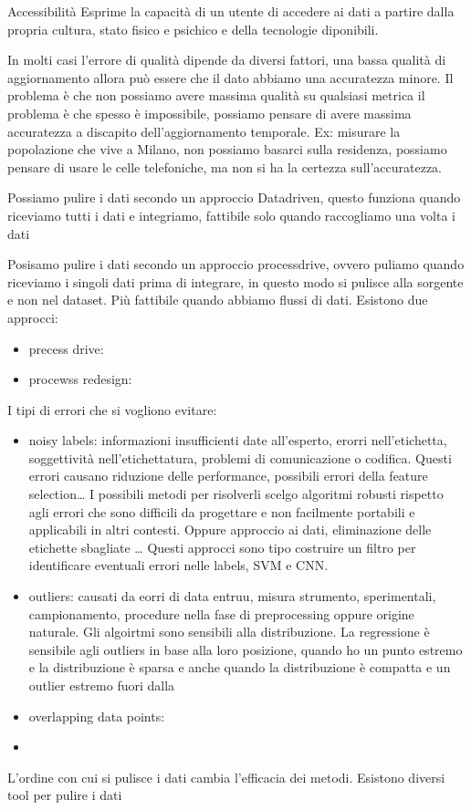 Accessibilità
Esprime la capacità di un utente di accedere ai dati a partire dalla propria cultura, stato 
fisico e psichico e della tecnologie diponibili.

In molti casi l'errore di qualità dipende da diversi fattori, una bassa qualità di 
aggiornamento allora può essere che il dato abbiamo una accuratezza minore. Il problema 
è che non possiamo avere massima qualità su qualsiasi metrica il problema è che 
spesso è impossibile, possiamo pensare di avere massima accuratezza a discapito 
dell'aggiornamento temporale. Ex: misurare la popolazione che vive a Milano, non 
possiamo basarci sulla residenza, possiamo pensare di usare le celle telefoniche, ma
non si ha la certezza sull'accuratezza.
 
Possiamo pulire i dati secondo un approccio Datadriven, questo funziona quando 
riceviamo tutti i dati e integriamo, fattibile solo quando raccogliamo una volta i dati

Posisamo pulire i dati secondo un approccio processdrive, ovvero puliamo quando 
riceviamo i singoli dati prima di integrare, in questo modo si pulisce alla sorgente 
e non nel dataset. Più fattibile quando abbiamo flussi di dati.
Esistono due approcci:
\begin{itemize}
      \item precess drive: 
      \item procewss redesign:
\end{itemize}

I tipi di errori che si vogliono evitare:
\begin{itemize}
      \item noisy labels: informazioni insufficienti date all'esperto, erorri 
      nell'etichetta, soggettività nell'etichettatura, problemi di comunicazione o codifica.
      Questi errori causano riduzione delle performance, possibili errori della 
      feature selection\dots
      I possibili metodi per risolverli scelgo algoritmi robusti rispetto agli errori
      che sono difficili da progettare e non facilmente portabili e applicabili in altri 
      contesti. Oppure approccio ai dati, eliminazione delle etichette sbagliate \dots
      Questi approcci sono tipo costruire un filtro per identificare eventuali errori
      nelle labels, SVM e CNN.
      \item outliers: causati da eorri di data entruu, misura strumento, sperimentali,
      campionamento, procedure nella fase di preprocessing oppure origine naturale.
      Gli algoirtmi sono sensibili alla distribuzione. La regressione è sensibile 
      agli outliers in base alla loro posizione, quando ho un punto estremo e la 
      distribuzione è sparsa e anche quando la distribuzione è compatta e un outlier estremo
      fuori dalla 
      \item overlapping data points:
      \item 
\end{itemize}

L'ordine con cui si pulisce i dati cambia l'efficacia dei metodi. Esistono diversi 
tool per pulire i dati